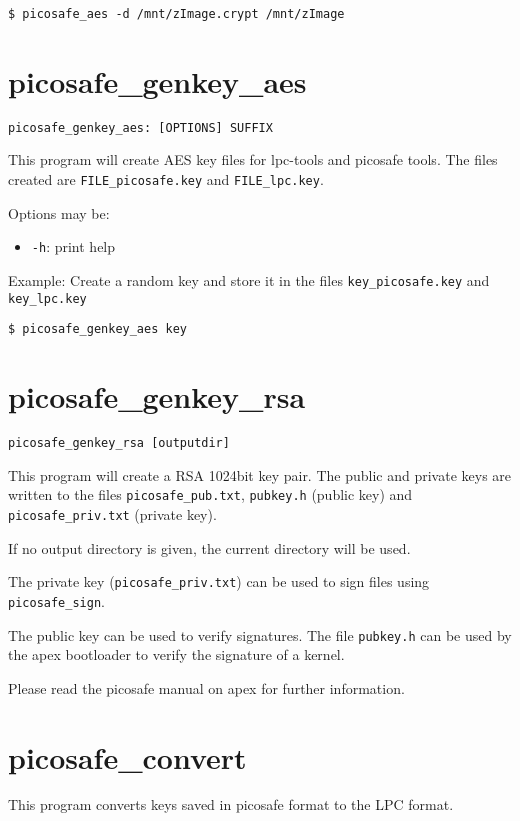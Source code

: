 \texttt{\$ picosafe\_aes -d /mnt/zImage.crypt /mnt/zImage}


\section{picosafe\_genkey\_aes}
\label{picosafe_genkey_aes}

\texttt{picosafe\_genkey\_aes: [OPTIONS] SUFFIX}

This program will create AES key files for lpc-tools and picosafe tools. The
files created are \texttt{FILE\_picosafe.key} and \texttt{FILE\_lpc.key}.

Options may be:
\begin{itemize}
\item \texttt{-h}: print help
\end{itemize}

Example: Create a random key and store it in the files \texttt{key\_picosafe.key} and \texttt{key\_lpc.key}

\texttt{\$ picosafe\_genkey\_aes key}


\section{picosafe\_genkey\_rsa}
\label{picosafe_genkey_rsa}

\texttt{picosafe\_genkey\_rsa [outputdir]}

This program will create a RSA 1024bit key pair. The public and private keys
are written to the files \texttt{picosafe\_pub.txt}, \texttt{pubkey.h} (public
key) and \texttt{picosafe\_priv.txt} (private key).

If no output directory is given, the current directory will be used.

The private key (\texttt{picosafe\_priv.txt}) can be used to sign files using
\texttt{picosafe\_sign}.

The public key can be used to verify signatures. The file \texttt{pubkey.h} can
be used by the apex bootloader to verify the signature of a kernel.

Please read the picosafe manual on apex for further information.


\section{picosafe\_convert}
\label{picosafe_convert}

This program converts keys saved in picosafe format to the LPC format.


